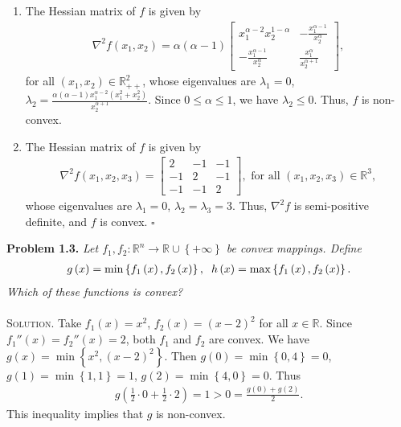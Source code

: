 \documentclass[a4paper]{article}
\numberwithin{equation}{section}
\begin{document}
\begin{enumerate}
\item The Hessian matrix of $f$ is given by
\begin{align}
{\nabla ^2}f\left( {{x_1},{x_2}} \right) = \alpha \left( {\alpha  - 1} \right)\left[ {\begin{array}{*{20}{c}}
{x_1^{\alpha  - 2}x_2^{1 - \alpha }}&{ - \frac{{x_1^{\alpha  - 1}}}{{x_2^\alpha }}}\\
{ - \frac{{x_1^{\alpha  - 1}}}{{x_2^\alpha }}}&{\frac{{x_1^\alpha }}{{x_2^{\alpha  + 1}}}}
\end{array}} \right],
\end{align}
for all $\left( {{x_1},{x_2}} \right) \in \mathbb{R}_{ +  + }^2$, whose eigenvalues are $\lambda _1=0$, ${\lambda _2} = \frac{{\alpha \left( {\alpha  - 1} \right)x_1^{\alpha  - 2}\left( {x_1^2 + x_2^2} \right)}}{{x_2^{\alpha  + 1}}}$. Since $0\le \alpha \le 1$, we have $\lambda _2\le 0$. Thus, $f$ is non-convex. 
\item The Hessian matrix of $f$ is given by
\begin{align}
{\nabla ^2}f\left( {{x_1},{x_2},{x_3}} \right) = \left[ {\begin{array}{*{20}{c}}
2&{ - 1}&{ - 1}\\
{ - 1}&2&{ - 1}\\
{ - 1}&{ - 1}&2
\end{array}} \right], \mbox{ for all } \left(x_1,x_2,x_3\right) \in \mathbb{R}^3,
\end{align}
whose eigenvalues are $\lambda _1=0$, $\lambda _2=\lambda _3 =3$. Thus, ${\nabla ^2}f$ is semi-positive definite, and $f$ is convex. \hfill $\square$
\end{enumerate}
\textbf{Problem 1.3.} \textit{Let ${f_1},{f_2}:{\mathbb{R}^n} \to \mathbb{R} \cup \left\{ { + \infty } \right\}$ be convex mappings. Define}
\begin{align}
g\left( x \right) = \min \left\{ {{f_1}\left( x \right),{f_2}\left( x \right)} \right\},\hspace{0.2cm} h\left( x \right) = \max \left\{ {{f_1}\left( x \right),{f_2}\left( x \right)} \right\}.
\end{align}
\textit{Which of these functions is convex?}\\
\\
\textsc{Solution.} Take ${f_1}\left( x \right) = {x^2}$, ${f_2}\left( x \right) = {\left( {x - 2} \right)^2}$ for all $x\in\mathbb{R}$. Since ${f_1}''\left( x \right) = {f_2}''\left( x \right) = 2$, both $f_1$ and $f_2$ are convex. We have $g\left( x \right) = \min \left\{ {{x^2},{{\left( {x - 2} \right)}^2}} \right\}$. Then $g\left( 0 \right) = \min \left\{ {0,4} \right\} = 0$, $g\left( 1 \right) = \min \left\{ {1,1} \right\} = 1$, $g\left( 2 \right) = \min \left\{ {4,0} \right\} =0$. Thus
\begin{align}
g\left( {\frac{1}{2} \cdot 0 + \frac{1}{2} \cdot 2} \right) = 1 > 0 = \frac{{g\left( 0 \right) + g\left( 2 \right)}}{2}.
\end{align}
This inequality implies that $g$ is non-convex. 
\end{document}
